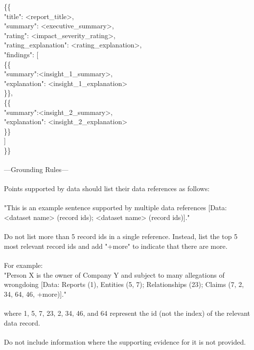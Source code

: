 {    \{\{\\
        "title": <report\_title>,\\
        "summary": <executive\_summary>,\\
        "rating": <impact\_severity\_rating>,\\
        "rating\_explanation": <rating\_explanation>,\\
        "findings": [\\
            \{\{\\
                "summary":<insight\_1\_summary>,\\
                "explanation": <insight\_1\_explanation>\\
            \}\},\\
            \{\{\\
                "summary":<insight\_2\_summary>,\\
                "explanation": <insight\_2\_explanation>\\
            \}\}\\
        ]\\
    \}\}\\
\\
---Grounding Rules---\\
\\
Points supported by data should list their data references as follows:\\
\\
"This is an example sentence supported by multiple data references [Data: <dataset name> (record ids); <dataset name> (record ids)]."\\
\\
Do not list more than 5 record ids in a single reference. Instead, list the top 5 most relevant record ids and add "+more" to indicate that there are more.\\
\\
For example:\\
"Person X is the owner of Company Y and subject to many allegations of wrongdoing [Data: Reports (1), Entities (5, 7); Relationships (23); Claims (7, 2, 34, 64, 46, +more)]."\\
\\
where 1, 5, 7, 23, 2, 34, 46, and 64 represent the id (not the index) of the relevant data record.\\
\\
Do not include information where the supporting evidence for it is not provided.\\
\\
}
